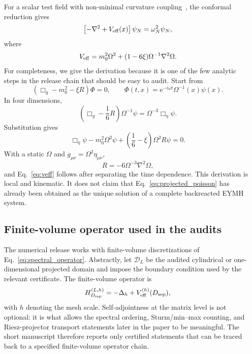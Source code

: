 \documentclass[aps,prd,onecolumn,notitlepage,nofootinbib,superscriptaddress,11pt,floatfix]{revtex4-2}
\newcommand{\ee}{\mathrm{e}}
\newcommand{\Dsep}{D_{\rm sep}}
\begin{document}
For a scalar test field with non-minimal curvature coupling~\cite{BirrellDavies1982}, the conformal reduction gives
\begin{equation}
    \left[-\nabla^2+V_{\rm eff}(x)\right]\psi_N=\omega_N^2\psi_N,
    \label{eq:spectral_operator}
\end{equation}
where
\begin{equation}
    V_{\rm eff}=m_0^2\Omega^2+(1-6\xi)\Omega^{-1}\nabla^2\Omega.
    \label{eq:veff}
\end{equation}
For completeness, we give the derivation because it is one of the few analytic steps in the release chain that should be easy to audit.
Start from
\begin{equation}
    (\Box_g-m_0^2-\xi R)\Phi=0,\qquad
    \Phi(t,x)=\ee^{-i\omega t}\Omega^{-1}(x)\psi(x).
\end{equation}
In four dimensions,
\begin{equation}
    \left(\Box_g-\frac{1}{6}R\right)\Omega^{-1}\psi
    =
    \Omega^{-3}\Box_\eta\psi.
    \label{eq:conformal_identity}
\end{equation}
Substitution gives
\begin{equation}
    \Box_\eta\psi-m_0^2\Omega^2\psi+\left(\frac{1}{6}-\xi\right)\Omega^2R\psi=0.
\end{equation}
With a static \(\Omega\) and \(g_{\mu\nu}=\Omega^2\eta_{\mu\nu}\),
\begin{equation}
    R=-6\Omega^{-3}\nabla^2\Omega,
\end{equation}
and Eq.~\eqref{eq:veff} follows after separating the time dependence.
This derivation is local and kinematic.
It does not claim that Eq.~\eqref{eq:projected_poisson} has already been obtained as the unique solution of a complete backreacted EYMH system.

\subsection{Finite-volume operator used in the audits}

The numerical release works with finite-volume discretizations of Eq.~\eqref{eq:spectral_operator}.
Abstractly, let \(\mathcal D_L\) be the audited cylindrical or one-dimensional projected domain and impose the boundary condition used by the relevant certificate.
The finite-volume operator is
\begin{equation}
    H_{\Dsep}^{(L,h)}
    =
    -\Delta_h+V_{\rm eff}^{(h)}(\Dsep),
    \label{eq:finite_volume_operator}
\end{equation}
with \(h\) denoting the mesh scale.
Self-adjointness at the matrix level is not optional: it is what allows the spectral ordering, Sturm/min--max counting, and Riesz-projector transport statements later in the paper to be meaningful.
The short manuscript therefore reports only certified statements that can be traced back to a specified finite-volume operator chain.
\end{document}
